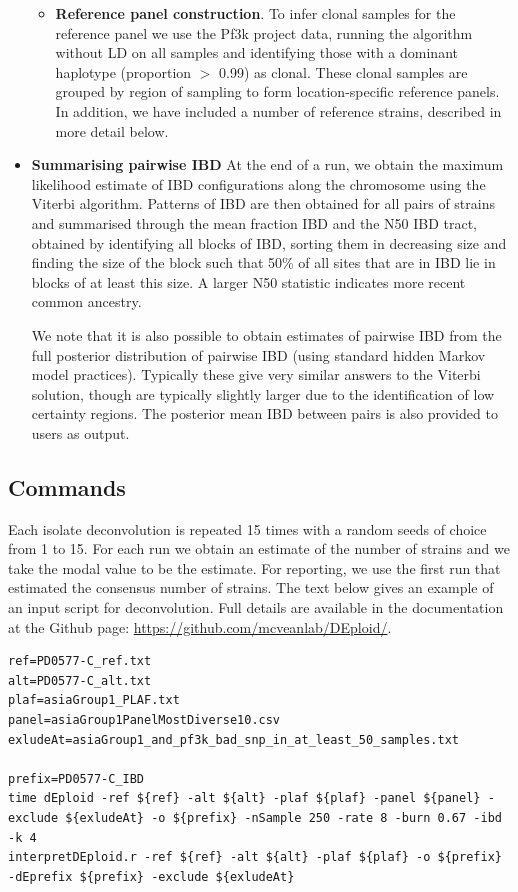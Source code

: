 \documentclass[9pt]{article}
\newcounter{todocounter}
\newcommand{\done}[2][]
{\todo[color=green!40, #1]{#2}}
\newcommand{\donenum}[2][]
{\stepcounter{todocounter}\done[#1]{\thetodocounter: #2}}
\begin{document}
\begin{itemize}
\begin{itemize}
\item {\bf Reference panel construction}. To infer clonal samples for the reference panel we use the Pf3k project data, running the algorithm without LD on all samples and identifying those with a dominant haplotype (proportion $>$ 0.99) as clonal.  These clonal samples are grouped by region of sampling to form location-specific reference panels.  In addition, we have included a number of reference strains, described in more detail below.

\end{itemize}

\item {\bf Summarising pairwise IBD}
\donenum{pairwise IBD tracts and relatedness}
At the end of a run, we obtain the maximum likelihood estimate of IBD configurations along the chromosome using the Viterbi algorithm.  Patterns of IBD are then obtained for all pairs of strains and summarised through the mean fraction IBD and the N50 IBD tract, obtained by identifying all blocks of IBD, sorting them in decreasing size and finding the size of the block such that 50\% of all sites that are in IBD lie in blocks of at least this size.  A larger N50 statistic indicates more recent common ancestry. 

We note that it is also possible to obtain estimates of pairwise IBD from the full posterior distribution of pairwise IBD (using standard hidden Markov model practices).  Typically these give very similar answers to the Viterbi solution, though are typically slightly larger due to the identification of low certainty regions.  The posterior mean IBD between pairs is also provided to users as output.

\end{itemize}




\subsection{Commands}
Each isolate deconvolution is repeated 15 times with a random seeds of choice from 1 to 15. For each run we obtain an estimate of the number of strains and we take the modal value to be the estimate.  For reporting, we use the first run that estimated the consensus number of strains.  The text below gives an example of an input script for deconvolution.  Full details are available in the documentation at the Github page: \url{https://github.com/mcveanlab/DEploid/}.
\linespread{1}
\begin{lstlisting}
ref=PD0577-C_ref.txt
alt=PD0577-C_alt.txt
plaf=asiaGroup1_PLAF.txt
panel=asiaGroup1PanelMostDiverse10.csv
exludeAt=asiaGroup1_and_pf3k_bad_snp_in_at_least_50_samples.txt

prefix=PD0577-C_IBD
time dEploid -ref ${ref} -alt ${alt} -plaf ${plaf} -panel ${panel} -exclude ${exludeAt} -o ${prefix} -nSample 250 -rate 8 -burn 0.67 -ibd -k 4
interpretDEploid.r -ref ${ref} -alt ${alt} -plaf ${plaf} -o ${prefix} -dEprefix ${prefix} -exclude ${exludeAt}
\end{lstlisting}
\end{document}
